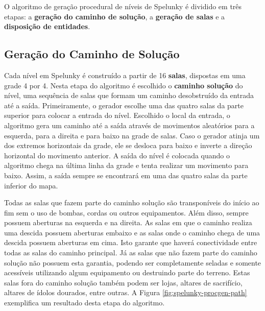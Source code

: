 O algoritmo de geração procedural de níveis de Spelunky é dividido em três
etapas: a \textbf{geração do caminho de solução}, a \textbf{geração de salas} e
a \textbf{disposição de entidades}.

\subsection{\label{section:spelunky-procgen-path}Geração do Caminho de Solução}
Cada nível em Spelunky é construído a partir de 16 \textbf{salas}, dispostas em
uma grade 4 por 4. Nesta etapa do algoritmo é escolhido o \textbf{caminho
solução} do nível, uma sequência de salas que formam um caminho desobstruído da
entrada até a saída. Primeiramente, o gerador escolhe uma das quatro salas da
parte superior para colocar a entrada do nível. Escolhido o local da entrada, o
algoritmo gera um caminho até a saída através de movimentos aleatórios para a
esquerda, para a direita e para baixo na grade de salas. Caso o gerador atinja
um dos extremos horizontais da grade, ele se desloca para baixo e inverte a
direção horizontal do movimento anterior. A saída do nível é colocada quando o
algoritmo chega na última linha da grade e tenta realizar um movimento para
baixo. Assim, a saída sempre se encontrará em uma das quatro salas da parte
inferior do mapa.

Todas as salas que fazem parte do caminho solução são transponíveis do início ao
fim sem o uso de bombas, cordas ou outros equipamentos. Além disso, sempre
possuem aberturas na esquerda e na direita. As salas em que o caminho realiza
uma descida possuem aberturas embaixo e as salas onde o caminho chega de uma
descida possuem aberturas em cima. Isto garante que haverá conectividade entre
todas as salas do caminho principal. Já as salas que não fazem parte do caminho
solução não possuem esta garantia, podendo ser completamente seladas e somente
acessíveis utilizando algum equipamento ou destruindo parte do terreno. Estas
salas fora do caminho solução também podem ser lojas, altares de sacrifício,
altares de ídolos dourados, entre outras. A Figura
\ref{fig:spelunky-procgen-path} exemplifica um resultado desta etapa do
algoritmo.

